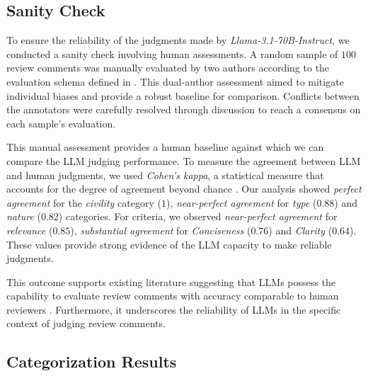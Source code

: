 \subsection{Sanity Check}
To ensure the reliability of the judgments made by \emph{Llama-3.1-70B-Instruct}, we conducted a sanity check involving human assessments. A random sample of $100$ review comments was manually evaluated by two authors according to the evaluation schema defined in . This dual-author assessment aimed to mitigate individual biases and provide a robust baseline for comparison. Conflicts between the annotators were carefully resolved through discussion to reach a consensus on each sample's evaluation.


This manual assessment provides a human baseline against which we can compare the LLM judging performance. To measure the agreement between LLM and human judgments, we used \emph{Cohen's kappa}, a statistical measure that accounts for the degree of agreement beyond chance \cite{mchugh2012interrater}. Our analysis showed \emph{perfect agreement} for the \emph{civility} category ($1$), \emph{near-perfect agreement} for \emph{type} ($0.88$) and \emph{nature} ($0.82$) categories. For criteria, we observed \emph{near-perfect agreement} for \emph{relevance} ($0.85$), \emph{substantial agreement} for \emph{Conciseness} ($0.76$) and \emph{Clarity} ($0.64$). These values provide strong evidence of the LLM capacity to make reliable judgments.


This outcome supports existing literature suggesting that LLMs possess the capability to evaluate review comments with accuracy comparable to human reviewers \cite{zheng2024judging, li2023alpacaeval}. Furthermore, it underscores the reliability of LLMs in the specific context of judging review comments.

\subsection{Categorization Results}

